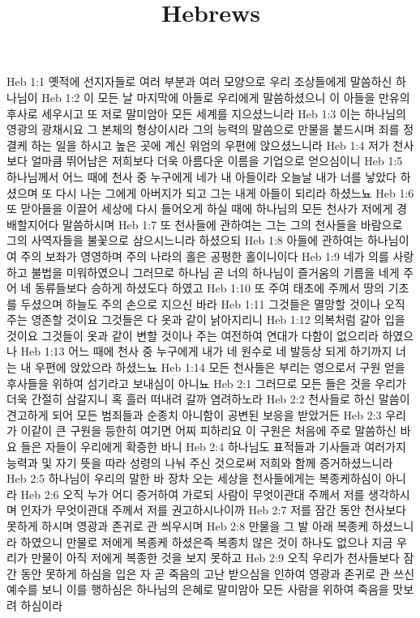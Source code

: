 

\title{Hebrews}

Heb 1:1  옛적에 선지자들로 여러 부분과 여러 모양으로 우리 조상들에게 말씀하신 하나님이
Heb 1:2  이 모든 날 마지막에 아들로 우리에게 말씀하셨으니 이 아들을 만유의 후사로 세우시고 또 저로 말미암아 모든 세계를 지으셨느니라
Heb 1:3  이는 하나님의 영광의 광채시요 그 본체의 형상이시라 그의 능력의 말씀으로 만물을 붙드시며 죄를 정결케 하는 일을 하시고 높은 곳에 계신 위엄의 우편에 앉으셨느니라
Heb 1:4  저가 천사보다 얼마큼 뛰어남은 저희보다 더욱 아름다운 이름을 기업으로 얻으심이니
Heb 1:5  하나님께서 어느 때에 천사 중 누구에게 네가 내 아들이라 오늘날 내가 너를 낳았다 하셨으며 또 다시 나는 그에게 아버지가 되고 그는 내게 아들이 되리라 하셨느뇨
Heb 1:6  또 맏아들을 이끌어 세상에 다시 들어오게 하실 때에 하나님의 모든 천사가 저에게 경배할지어다 말씀하시며
Heb 1:7  또 천사들에 관하여는 그는 그의 천사들을 바람으로 그의 사역자들을 불꽃으로 삼으시느니라 하셨으되
Heb 1:8  아들에 관하여는 하나님이여 주의 보좌가 영영하며 주의 나라의 홀은 공평한 홀이니이다
Heb 1:9  네가 의를 사랑하고 불법을 미워하였으니 그러므로 하나님 곧 너의 하나님이 즐거움의 기름을 네게 주어 네 동류들보다 승하게 하셨도다 하였고
Heb 1:10  또 주여 태초에 주께서 땅의 기초를 두셨으며 하늘도 주의 손으로 지으신 바라
Heb 1:11  그것들은 멸망할 것이나 오직 주는 영존할 것이요 그것들은 다 옷과 같이 낡아지리니
Heb 1:12  의복처럼 갈아 입을 것이요 그것들이 옷과 같이 변할 것이나 주는 여전하여 연대가 다함이 없으리라 하였으나
Heb 1:13  어느 때에 천사 중 누구에게 내가 네 원수로 네 발등상 되게 하기까지 너는 내 우편에 앉았으라 하셨느뇨
Heb 1:14  모든 천사들은 부리는 영으로서 구원 얻을 후사들을 위하여 섬기라고 보내심이 아니뇨
Heb 2:1  그러므로 모든 들은 것을 우리가 더욱 간절히 삼갈지니 혹 흘러 떠내려 갈까 염려하노라
Heb 2:2  천사들로 하신 말씀이 견고하게 되어 모든 범죄들과 순종치 아니함이 공변된 보응을 받았거든
Heb 2:3  우리가 이같이 큰 구원을 등한히 여기면 어찌 피하리요 이 구원은 처음에 주로 말씀하신 바요 들은 자들이 우리에게 확증한 바니
Heb 2:4  하나님도 표적들과 기사들과 여러가지 능력과 및 자기 뜻을 따라 성령의 나눠 주신 것으로써 저희와 함께 증거하셨느니라
Heb 2:5  하나님이 우리의 말한 바 장차 오는 세상을 천사들에게는 복종케하심이 아니라
Heb 2:6  오직 누가 어디 증거하여 가로되 사람이 무엇이관대 주께서 저를 생각하시며 인자가 무엇이관대 주께서 저를 권고하시나이까
Heb 2:7  저를 잠간 동안 천사보다 못하게 하시며 영광과 존귀로 관 씌우시며
Heb 2:8  만물을 그 발 아래 복종케 하셨느니라 하였으니 만물로 저에게 복종케 하셨은즉 복종치 않은 것이 하나도 없으나 지금 우리가 만물이 아직 저에게 복종한 것을 보지 못하고
Heb 2:9  오직 우리가 천사들보다 잠간 동안 못하게 하심을 입은 자 곧 죽음의 고난 받으심을 인하여 영광과 존귀로 관 쓰신 예수를 보니 이를 행하심은 하나님의 은혜로 말미암아 모든 사람을 위하여 죽음을 맛보려 하심이라
